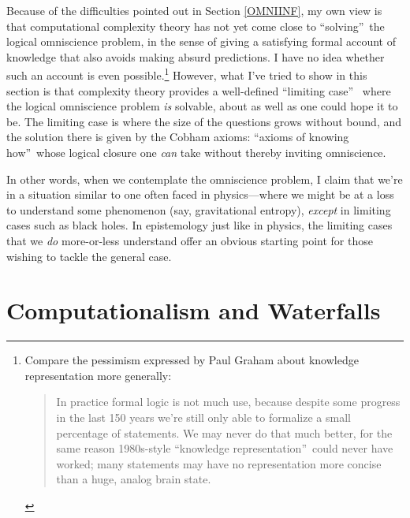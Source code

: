 \documentclass[12pt,onecolumn]{article}%
\begin{document}
Because of the difficulties pointed out in Section \ref{OMNIINF}, my own view
is that computational complexity theory has not yet come close to
\textquotedblleft solving\textquotedblright\  the logical omniscience problem,
in the sense of giving a satisfying formal account of knowledge that also
avoids making absurd predictions. I have no idea whether such an account is
even possible.\footnote{Compare the pessimism expressed by Paul Graham
\cite{graham} about knowledge representation more generally:
\par
\begin{quotation}
\noindent In practice formal logic is not much use, because despite some
progress in the last 150 years we're still only able to formalize a small
percentage of statements. We may never do that much better, for the same
reason 1980s-style \textquotedblleft knowledge
representation\textquotedblright\  could never have worked; many statements may
have no representation more concise than a huge, analog brain state.
\end{quotation}
} However, what I've tried to show in this section is that complexity theory
provides a well-defined \textquotedblleft limiting case\textquotedblright\ %
 where the logical omniscience problem \textit{is} solvable, about as well as
one could hope it to be. The limiting case is where the size of the
questions grows without bound, and the solution there is given by the Cobham
axioms: \textquotedblleft axioms of knowing how\textquotedblright\  whose
logical closure one \textit{can} take without thereby inviting omniscience.

In other words, when we contemplate the omniscience problem, I claim that
we're in a situation similar to one often faced in physics---where we might be
at a loss to understand some phenomenon (say, gravitational entropy),
\textit{except} in limiting cases such as black holes. In epistemology just
like in physics, the limiting cases that we \textit{do} more-or-less
understand offer an obvious starting point for those wishing to tackle the
general case.

\section{Computationalism and Waterfalls\label{WATERFALLS}}
\end{document}
